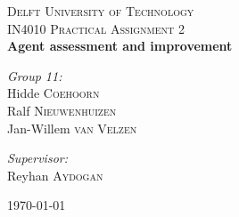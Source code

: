 \documentclass[11pt,a4paper]{report}
\begin{document}
\begin{titlepage}
\begin{center}



\textsc{\LARGE Delft University of Technology}\\[1.5cm]

\textsc{\Large IN4010 Practical Assignment 2}\\[0.5cm]

{ \huge \bfseries Agent assessment and improvement \\[0.4cm] }


\noindent
\begin{minipage}{0.4\textwidth}
\begin{flushleft} \large
\emph{Group 11:}\\
Hidde \textsc{Coehoorn}\\
Ralf \textsc{Nieuwenhuizen}\\
Jan-Willem \textsc{van Velzen}
\end{flushleft}
\end{minipage}%
\begin{minipage}{0.4\textwidth}
\begin{flushright} \large
\emph{Supervisor:} \\
Reyhan \textsc{Aydogan}
\end{flushright}
\end{minipage}

\vfill

{\large \today}

\end{center}
\end{titlepage}

\newpage
\end{document}
